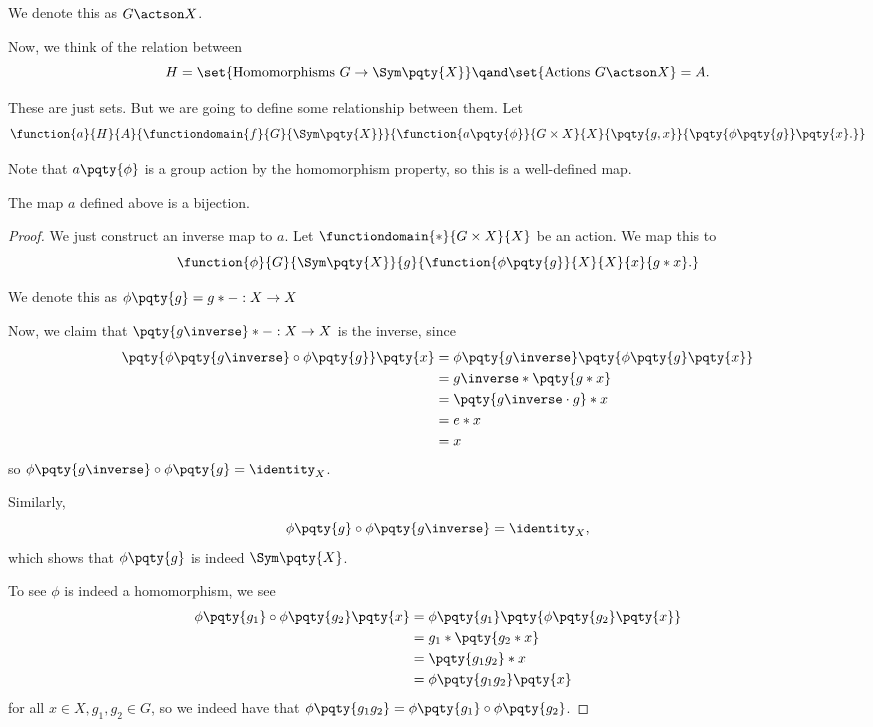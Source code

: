 We denote this as \(G \actson X\).

Now, we think of the relation between
\[
    H = \set{\text{Homomorphisms } G \to \Sym\pqty{X}} \qand \set{\text{Actions } G \actson X} = A.
\]

These are just sets. But we are going to define some relationship between them. Let
\[
    \function{a}{H}{A}{
        \functiondomain{f}{G}{\Sym\pqty{X}}}{
            \function{a\pqty{\phi}}{G\times X}{X}{\pqty{g, x}}{\pqty{\phi\pqty{g}}\pqty{x}.}
        }
\]

Note that \(a\pqty{\phi}\) is a group action by the homomorphism property, so this is a well-defined map.

\begin{proposition}
    \label{prop:permutation-representation-actions}%
    The map \(a\) defined above is a bijection.
\end{proposition}

\begin{proof}
    We just construct an inverse map to \(a\). Let \(\functiondomain{\ast}{G \times X}{X}\) be an action. We map this to
    \[
        \function{\phi}{G}{\Sym\pqty{X}}{g}{\function{\phi\pqty{g}}{X}{X}{x}{g \ast x}.}
    \]

    We denote this as \(\phi\pqty{g} = g \ast - : X \to X\)

    Now, we claim that \(\pqty{g\inverse} \ast -: X \to X\) is the inverse, since
    \begin{align*}
        \pqty{\phi\pqty{g\inverse} \circ \phi\pqty{g}} \pqty{x} &= \phi\pqty{g\inverse} \pqty{\phi\pqty{g} \pqty{x}} \\
        &= g\inverse \ast \pqty{g \ast x} \\
        &= \pqty{g\inverse \cdot g} \ast x \\
        &= e \ast x \\
        &= x
    \end{align*}
    so \(\phi\pqty{g\inverse} \circ \phi\pqty{g} = \identity_X\).

    Similarly,
    \[
        \phi\pqty{g} \circ \phi\pqty{g\inverse} = \identity_X,
    \]
    which shows that \(\phi\pqty{g}\) is indeed \(\Sym\pqty{X}\).

    To see \(\phi\) is indeed a homomorphism, we see
    \begin{align*}
        \phi\pqty{g_1} \circ \phi\pqty{g_2} \pqty{x} &= \phi\pqty{g_1} \pqty{\phi\pqty{g_2} \pqty{x}} \\
        &= g_1 \ast \pqty{g_2 \ast x} \\
        &= \pqty{g_1 g_2} \ast x \\
        &= \phi\pqty{g_1 g_2} \pqty{x}
    \end{align*}
    for all \(x \in X, g_1, g_2 \in G\), so we indeed have that \(\phi\pqty{g_1 g_2} = \phi\pqty{g_1} \circ \phi\pqty{g_2}\).
\end{proof}

